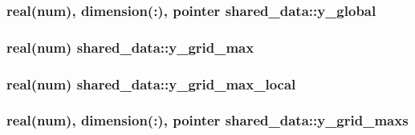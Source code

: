 \subsubsection[{\texorpdfstring{y\+\_\+global}{y_global}}]{\setlength{\rightskip}{0pt plus 5cm}real(num), dimension(\+:), pointer shared\+\_\+data\+::y\+\_\+global}\hypertarget{namespaceshared__data_a983366c15907d7a58fe04de8a618aa7f}{}\label{namespaceshared__data_a983366c15907d7a58fe04de8a618aa7f}
\subsubsection[{\texorpdfstring{y\+\_\+grid\+\_\+max}{y_grid_max}}]{\setlength{\rightskip}{0pt plus 5cm}real(num) shared\+\_\+data\+::y\+\_\+grid\+\_\+max}\hypertarget{namespaceshared__data_a37d0ccaa88ff8097e3e496c1499acb9b}{}\label{namespaceshared__data_a37d0ccaa88ff8097e3e496c1499acb9b}
\subsubsection[{\texorpdfstring{y\+\_\+grid\+\_\+max\+\_\+local}{y_grid_max_local}}]{\setlength{\rightskip}{0pt plus 5cm}real(num) shared\+\_\+data\+::y\+\_\+grid\+\_\+max\+\_\+local}\hypertarget{namespaceshared__data_a2690e59dee9f1fae66f0a6d9abf19b88}{}\label{namespaceshared__data_a2690e59dee9f1fae66f0a6d9abf19b88}
\subsubsection[{\texorpdfstring{y\+\_\+grid\+\_\+maxs}{y_grid_maxs}}]{\setlength{\rightskip}{0pt plus 5cm}real(num), dimension(\+:), pointer shared\+\_\+data\+::y\+\_\+grid\+\_\+maxs}\hypertarget{namespaceshared__data_ad3b97b7b23eb4f1708bf6934787c3bc9}{}\label{namespaceshared__data_ad3b97b7b23eb4f1708bf6934787c3bc9}

